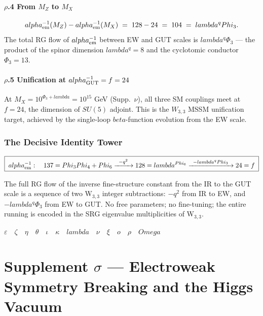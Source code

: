 \documentclass[12pt,a4paper]{article}
\def\mathrm#1{#1}%
\def\alpha{alpha}%
\def\beta{beta}%
\def\lambda{lambda}%
\def\Phi#1{Phi#1}%
\def\Omega{Omega}%
\def\cdot{ }%
\theoremstyle{definition}
\newcommand{\SU}{\mathrm{SU}}
\begin{document}
\subsection*{$\rho$.4 \quad From $M_Z$ to $M_X$}
\[
\alpha_{\rm em}^{-1}(M_Z) - \alpha_{\rm em}^{-1}(M_X) \;=\; 128 - 24 \;=\; 104 \;=\; \lambda^q \cdot \Phi_3.
\]
The total RG flow of $\alpha_{\rm em}^{-1}$ between EW and GUT scales
is $\lambda^q\Phi_3$ — the product of the spinor dimension $\lambda^q
= 8$ and the cyclotomic conductor $\Phi_3 = 13$.

\subsection*{$\rho$.5 \quad Unification at $\alpha_{\rm GUT}^{-1} = f = 24$}
At $M_X = 10^{\Phi_3 + \lambda} = 10^{15}$ GeV (Supp.~$\nu$), all three
SM couplings meet at $f = 24$, the dimension of $\SU(5)$ adjoint.
This is the $W_{3,3}$ MSSM unification target, achieved by the
single-loop $\beta$-function evolution from the EW scale.

\section*{The Decisive Identity Tower}

\[
\boxed{\;\alpha_{\rm em}^{-1}: \quad 137 = \Phi_3\Phi_4+\Phi_6
\xrightarrow{\;\;-q^2\;\;} 128 = \lambda^{\Phi_6}
\xrightarrow{\;\;-\lambda^q\Phi_3\;\;} 24 = f\;}
\]

The full RG flow of the inverse fine-structure constant from the IR
to the GUT scale is a sequence of two W$_{3,3}$ integer subtractions:
$-q^2$ from IR to EW, and $-\lambda^q\Phi_3$ from EW to GUT. No free
parameters; no fine-tuning; the entire running is encoded in the
SRG eigenvalue multiplicities of W$_{3,3}$.

\hfill$\varepsilon\quad\zeta\quad\eta\quad\theta\quad\iota\quad\kappa\quad\lambda\quad\nu\quad\xi\quad o\quad\rho\quad\Omega$

\clearpage
\part*{\texorpdfstring{Supplement $\sigma$ --- Electroweak Symmetry Breaking and the Higgs Vacuum}{Supplement sigma --- Electroweak Symmetry Breaking and the Higgs Vacuum}}
\end{document}
